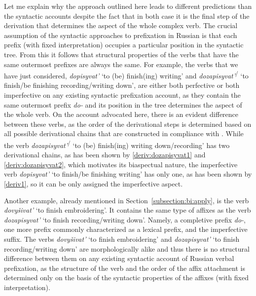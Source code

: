 Let me explain why the approach outlined here leads to different predictions than the syntactic accounts despite the fact that in both case it is the final step of the derivation that determines the aspect of the whole complex verb. The crucial assumption of the syntactic approaches to prefixation in Russian is that each prefix (with fixed interpretation) occupies a particular position in the syntactic tree. From this it follows that structural properties of the verbs that have the same outermost prefixes are always the same. For example, the verbs that we have just considered, \textit{dopisyvat'}\textsuperscript{\IPF} `to (be) finish(ing) writing' and \textit{dozapisyvat'}\textsuperscript{\IPF\slash\PF} `to finish/be finishing recording/writing down', are either both perfective or both imperfective on any existing syntactic prefixation account, as they contain the same outermost prefix \textit{do-} and its position in the tree determines the aspect of the whole verb. On the account advocated here, there is an evident difference between these verbs, as the order of the derivational steps is determined based on all possible derivational chains that are constructed in compliance with . While the verb \textit{dozapisyvat'}\textsuperscript{\IPF\slash\PF} `to (be) finish(ing) writing down/recording' has two derivational chains, as has been shown by \ref{deriv:dozapisyvat1} and \ref{deriv:dozapisyvat2}, which motivates its biaspectual nature, the imperfective verb \textit{dopisyvat'}\textsuperscript{\IPF} `to finish/be finishing writing' has only one, as has been shown by \ref{deriv1}, so it can be only assigned the imperfective aspect.

Another example, already mentioned in Section~\ref{subsection:bi:apply}, is the verb \textit{dovy\v{s}ivat'} `to finish embroidering'. It contains the same type of affixes as the verb \textit{dozapisyvat'} `to finish recording/writing down'. Namely, a completive prefix \textit{do-}, one more prefix commonly characterized as a lexical prefix, and the imperfective suffix. The verbs \textit{dovy\v{s}ivat'} `to finish embroidering' and \textit{dozapisyvat'} `to finish recording/writing down' are morphologically alike and thus there is no structural difference between them on any existing syntactic account of Russian verbal prefixation, as the structure of the verb and the order of the affix attachment is determined only on the basis of the syntactic properties of the affixes (with fixed interpretation).
 
